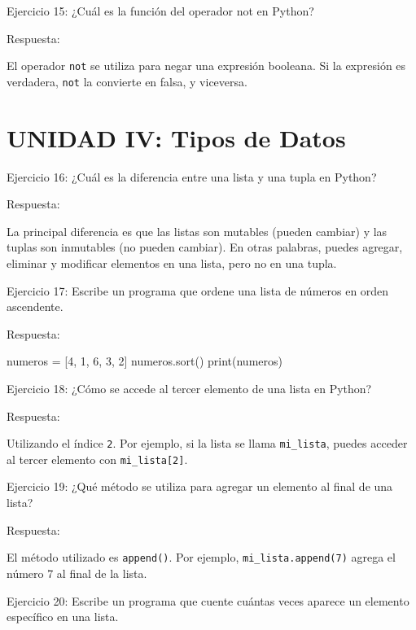 \documentclass[
  a4paper,
  onepage,
  openany]{scrreprt}
\newenvironment{Shaded}{\begin{snugshade}}{\end{snugshade}}
\newcommand{\BuiltInTok}[1]{\textcolor[rgb]{0.00,0.23,0.31}{#1}}
\newcommand{\DecValTok}[1]{\textcolor[rgb]{0.68,0.00,0.00}{#1}}
\newcommand{\NormalTok}[1]{\textcolor[rgb]{0.00,0.23,0.31}{#1}}
\newcommand{\OperatorTok}[1]{\textcolor[rgb]{0.37,0.37,0.37}{#1}}
\begin{document}
Ejercicio 15: ¿Cuál es la función del operador not en Python?

Respuesta:

El operador \texttt{not} se utiliza para negar una expresión booleana.
Si la expresión es verdadera, \texttt{not} la convierte en falsa, y
viceversa.

\hypertarget{unidad-iv-tipos-de-datos-1}{%
\section{UNIDAD IV: Tipos de Datos}\label{unidad-iv-tipos-de-datos-1}}

Ejercicio 16: ¿Cuál es la diferencia entre una lista y una tupla en
Python?

Respuesta:

La principal diferencia es que las listas son mutables (pueden cambiar)
y las tuplas son inmutables (no pueden cambiar). En otras palabras,
puedes agregar, eliminar y modificar elementos en una lista, pero no en
una tupla.

Ejercicio 17: Escribe un programa que ordene una lista de números en
orden ascendente.

Respuesta:

\begin{Shaded}
\begin{Highlighting}[]
\NormalTok{numeros }\OperatorTok{=}\NormalTok{ [}\DecValTok{4}\NormalTok{, }\DecValTok{1}\NormalTok{, }\DecValTok{6}\NormalTok{, }\DecValTok{3}\NormalTok{, }\DecValTok{2}\NormalTok{]}
\NormalTok{numeros.sort()}
\BuiltInTok{print}\NormalTok{(numeros)}
\end{Highlighting}
\end{Shaded}

Ejercicio 18: ¿Cómo se accede al tercer elemento de una lista en Python?

Respuesta:

Utilizando el índice \texttt{2}. Por ejemplo, si la lista se llama
\texttt{mi\_lista}, puedes acceder al tercer elemento con
\texttt{mi\_lista{[}2{]}}.

Ejercicio 19: ¿Qué método se utiliza para agregar un elemento al final
de una lista?

Respuesta:

El método utilizado es \texttt{append()}. Por ejemplo,
\texttt{mi\_lista.append(7)} agrega el número 7 al final de la lista.

Ejercicio 20: Escribe un programa que cuente cuántas veces aparece un
elemento específico en una lista.
\end{document}

